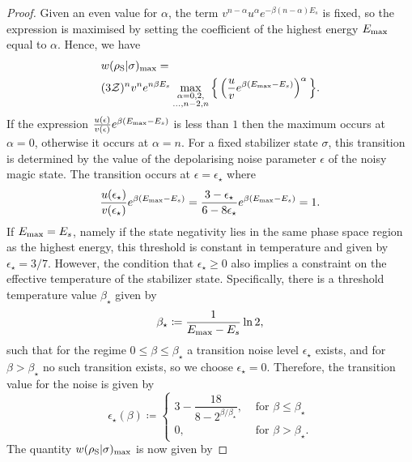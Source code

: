 \documentclass[pra,
aps,
twocolumn,
superscriptaddress,
groupedaddress,
nofootinbib,
reprint
]{revtex4-1}
\begin{document}
\begin{proof}
Given an even value for $\alpha$, the term $v^{n-\alpha} u^{\alpha} e^{-\beta (n-\alpha)E_s}$ is fixed, so the expression is maximised by setting the coefficient of the highest energy $E_{\rm{max}}$ equal to $\alpha$.
Hence, we have
\begin{align}
	&w(\rho_{\rm{S}} | \sigma)_{\rm{max}} = \nonumber\\
	&(3\mathcal{Z})^{n} v^n e^{n\beta E_s}\max\limits_{\substack{\alpha = 0,2, \\ \dots,n-2,n}}{\Big\{ \left( \frac{u}{v} e^{\beta (E_{\rm{max}} - E_s)} \right)^{\alpha} \Big\}}.
\end{align}
If the expression $\frac{u(\epsilon)}{v(\epsilon)} e^{\beta (E_{\rm{max}} - E_s)}$ is less than $1$ then the maximum occurs at $\alpha=0$, otherwise it occurs at $\alpha = n$. For a fixed stabilizer state $\sigma$, this transition is determined by the value of the depolarising noise parameter $\epsilon$ of the noisy magic state. The transition occurs at $\epsilon = \epsilon_\star$ where
\begin{equation}\label{eq:noise_transition}
	\frac{u(\epsilon_\star)}{v(\epsilon_\star)} e^{\beta (E_{\rm{max}} - E_s)} = \frac{3-\epsilon_\star}{6-8\epsilon_\star} e^{\beta (E_{\rm{max}} - E_s)} = 1.
\end{equation}
If $E_{\rm{max}} = E_s$, namely if the state negativity lies in the same phase space region as the highest energy, this threshold is constant in temperature and given by $\epsilon_{\star} = 3/7$. However, the condition that $\epsilon_\star \ge 0$ also implies a constraint on the effective temperature of the stabilizer state. Specifically, there is a threshold temperature value $\beta_\star$ given by
\begin{equation}
	\beta_{\star} \coloneqq \frac{1}{E_{\rm{max}} - E_s} \ln2,
\end{equation}
such that for the regime $0 \leq \beta \leq \beta_\star$ a transition noise level $\epsilon_\star$ exists, and for $\beta > \beta_\star$ no such transition exists, so we choose $\epsilon_\star = 0$. 
Therefore, the transition value for the noise is given by
\begin{equation}
	\epsilon_{\star}(\beta) \coloneqq 
	\begin{cases}
		3 - \dfrac{18}{8-2^{\beta/\beta_\star}}, &\text{ for } \beta \leq \beta_\star \\
		0, &\text{ for } \beta > \beta_\star.
	\end{cases}
\end{equation}
The quantity $w(\rho_{\rm{S}} | \sigma)_{\rm{max}}$ is now given by

\end{proof}
\end{document}
